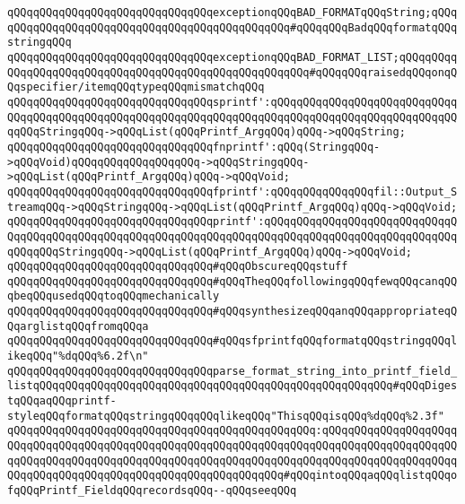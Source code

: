 \newline
\verb|qQQqqQQqqQQqqQQqqQQqqQQqqQQqqQQqexceptionqQQqBAD_FORMATqQQqString;qQQqqQQqqQQqqQQqqQQqqQQqqQQqqQQqqQQqqQQqqQQqqQQq#qQQqqQQqBadqQQqformatqQQqstringqQQq|\newline
\verb|qQQqqQQqqQQqqQQqqQQqqQQqqQQqqQQqexceptionqQQqBAD_FORMAT_LIST;qQQqqQQqqQQqqQQqqQQqqQQqqQQqqQQqqQQqqQQqqQQqqQQqqQQqqQQq#qQQqqQQqraisedqQQqonqQQqspecifier/itemqQQqtypeqQQqmismatchqQQq|\newline
\newline
\verb|qQQqqQQqqQQqqQQqqQQqqQQqqQQqqQQqsprintf':qQQqqQQqqQQqqQQqqQQqqQQqqQQqqQQqqQQqqQQqqQQqqQQqqQQqqQQqqQQqqQQqqQQqqQQqqQQqqQQqqQQqqQQqqQQqqQQqqQQqqQQqStringqQQq->qQQqList(qQQqPrintf_ArgqQQq)qQQq->qQQqString;|\newline
\verb|qQQqqQQqqQQqqQQqqQQqqQQqqQQqqQQqfnprintf':qQQq(StringqQQq->qQQqVoid)qQQqqQQqqQQqqQQqqQQq->qQQqStringqQQq->qQQqList(qQQqPrintf_ArgqQQq)qQQq->qQQqVoid;|\newline
\verb|qQQqqQQqqQQqqQQqqQQqqQQqqQQqqQQqfprintf':qQQqqQQqqQQqqQQqfil::Output_StreamqQQq->qQQqStringqQQq->qQQqList(qQQqPrintf_ArgqQQq)qQQq->qQQqVoid;|\newline
\verb|qQQqqQQqqQQqqQQqqQQqqQQqqQQqqQQqprintf':qQQqqQQqqQQqqQQqqQQqqQQqqQQqqQQqqQQqqQQqqQQqqQQqqQQqqQQqqQQqqQQqqQQqqQQqqQQqqQQqqQQqqQQqqQQqqQQqqQQqqQQqqQQqStringqQQq->qQQqList(qQQqPrintf_ArgqQQq)qQQq->qQQqVoid;|\newline
\newline
\newline
\newline
\verb|qQQqqQQqqQQqqQQqqQQqqQQqqQQqqQQq#qQQqObscureqQQqstuff|\newline
\newline
\verb|qQQqqQQqqQQqqQQqqQQqqQQqqQQqqQQq#qQQqTheqQQqfollowingqQQqfewqQQqcanqQQqbeqQQqusedqQQqtoqQQqmechanically|\newline
\verb|qQQqqQQqqQQqqQQqqQQqqQQqqQQqqQQq#qQQqsynthesizeqQQqanqQQqappropriateqQQqarglistqQQqfromqQQqa|\newline
\verb|qQQqqQQqqQQqqQQqqQQqqQQqqQQqqQQq#qQQqsfprintfqQQqformatqQQqstringqQQqlikeqQQq"%dqQQq%6.2f\n"|\newline
\newline
\verb|qQQqqQQqqQQqqQQqqQQqqQQqqQQqqQQqparse_format_string_into_printf_field_listqQQqqQQqqQQqqQQqqQQqqQQqqQQqqQQqqQQqqQQqqQQqqQQqqQQqqQQq#qQQqDigestqQQqaqQQqprintf-styleqQQqformatqQQqstringqQQqqQQqlikeqQQq"ThisqQQqisqQQq%dqQQq%2.3f"|\newline
\verb|qQQqqQQqqQQqqQQqqQQqqQQqqQQqqQQqqQQqqQQqqQQqqQQq:qQQqqQQqqQQqqQQqqQQqqQQqqQQqqQQqqQQqqQQqqQQqqQQqqQQqqQQqqQQqqQQqqQQqqQQqqQQqqQQqqQQqqQQqqQQqqQQqqQQqqQQqqQQqqQQqqQQqqQQqqQQqqQQqqQQqqQQqqQQqqQQqqQQqqQQqqQQqqQQqqQQqqQQqqQQqqQQqqQQqqQQqqQQqqQQqqQQqqQQqqQQq#qQQqintoqQQqaqQQqlistqQQqofqQQqPrintf_FieldqQQqrecordsqQQq--qQQqseeqQQq|\newline
